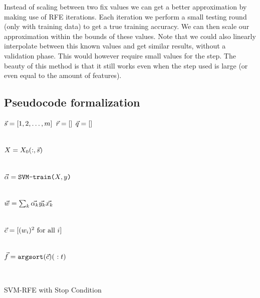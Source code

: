 Instead of scaling between two fix values we can get a better approximation by making use of RFE iterations. Each iteration we perform a small testing round (only with training data) to get a true training accuracy. We can then scale our approximation within the bounds of these values. Note that we could also linearly interpolate between this known values and get similar results, without a validation phase. This would however require small values for the step. The beauty of this method is that it still works even when the step used is large (or even equal to the amount of features).

\subsection{Pseudocode formalization}

\begin{algorithm}[H]
    \DontPrintSemicolon
      $\vec{s} = [1,2, \dotsc, m]$ 
      $\vec{r} = []$ 
      $\vec{q} = []$ 
        {
            \\
            $X=X_0(:,\vec{s})$\VS

            \\
            $\vec{\alpha} = \texttt{SVM-train(} X, y \texttt{)}$\VS

            \\
            $\vec{w} = \sum_k{\vec{\alpha_k} \vec{y_k} \vec{x_k}}$\VS

            \\
            $\vec{c} = [(w_i)^2 \text{ for all $i$}]$\VS

            \\
            $\vt{f} = \texttt{argsort}(\vt{c})(\ :t)$\VS

            \\
        }
    \caption{SVM-RFE with Stop Condition}
    \label{alg:svmrfe.stopcond}
\end{algorithm}\VS\VS

